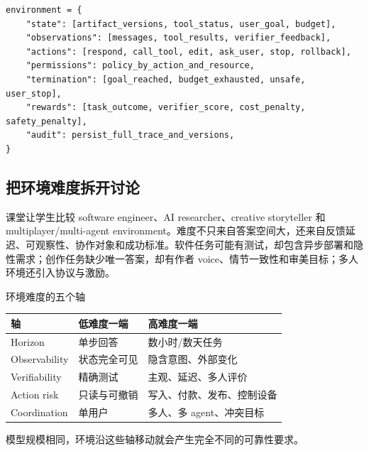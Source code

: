 \begin{lstlisting}[caption={可训练也可部署的 RL environment contract}]
environment = {
    "state": [artifact_versions, tool_status, user_goal, budget],
    "observations": [messages, tool_results, verifier_feedback],
    "actions": [respond, call_tool, edit, ask_user, stop, rollback],
    "permissions": policy_by_action_and_resource,
    "termination": [goal_reached, budget_exhausted, unsafe, user_stop],
    "rewards": [task_outcome, verifier_score, cost_penalty, safety_penalty],
    "audit": persist_full_trace_and_versions,
}
\end{lstlisting}

\subsection{把环境难度拆开讨论}

课堂让学生比较 software engineer、AI researcher、creative storyteller 和 multiplayer/multi-agent environment。难度不只来自答案空间大，还来自反馈延迟、可观察性、协作对象和成功标准。软件任务可能有测试，却包含异步部署和隐性需求；创作任务缺少唯一答案，却有作者 voice、情节一致性和审美目标；多人环境还引入协议与激励。


\begin{knowledgebox}{环境难度的五个轴}
\begin{tabularx}{\textwidth}{L{0.20\textwidth} X X}
\toprule
轴 & 低难度一端 & 高难度一端 \\
\midrule
Horizon & 单步回答 & 数小时/数天任务 \\
Observability & 状态完全可见 & 隐含意图、外部变化 \\
Verifiability & 精确测试 & 主观、延迟、多人评价 \\
Action risk & 只读与可撤销 & 写入、付款、发布、控制设备 \\
Coordination & 单用户 & 多人、多 agent、冲突目标 \\
\bottomrule
\end{tabularx}
模型规模相同，环境沿这些轴移动就会产生完全不同的可靠性要求。
\end{knowledgebox}


